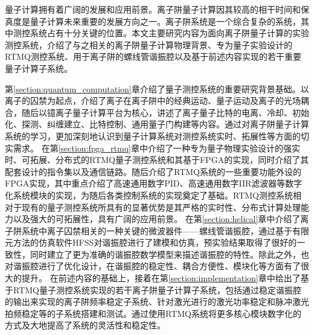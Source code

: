 
\begin{conclusion}

量子计算拥有着广阔的发展和应用前景。离子阱量子计算因其较高的相干时间和保真度是量子计算未来重要的发展方向之一。离子阱系统是一个综合复杂的系统，其中测控系统占有十分关键的位置。本文主要研究内容为面向离子阱量子计算的实验测控系统，介绍了与之相关的离子阱量子计算物理背景、专为量子实验设计的RTMQ测控系统、用于离子阱的螺线管谐振腔以及基于前述内容实现的若干重要量子计算子系统。

第\ref{section:quantum_computation}章介绍了量子测控系统的重要研究背景基础。以离子的囚禁为起点，介绍了离子在离子阱中的经典运动、量子运动及离子的光场耦合，随后以镱离子量子计算平台为核心，讲述了离子量子比特的电离、冷却、初始化、探测、纠缠建立、比特控制、通用量子门构建等内容。通过对离子阱量子计算系统的学习，更加深刻地认识到量子计算系统对测控系统实时、拓展性等方面的切实需求。
在第\ref{section:fpga_rtmq}章中介绍了一种专为量子物理实验设计的强实时、可拓展、分布式的RTMQ量子测控系统和其基于FPGA的实现，同时介绍了其配套设计的指令集以及通信链路。随后介绍了RTMQ系统的一些重要功能外设的FPGA实现，其中重点介绍了高速通用数字PID、高速通用数字IIR滤波器等数字化系统模块的实现，为随后各类控制系统的实现奠定了基础。RTMQ测控系统相对于现有的量子测控系统所具有的显著优势是其严格的实时性、分布式计算处理能力以及强大的可拓展性，具有广阔的应用前景。
在第\ref{section:helical}章中介绍了离子阱系统中离子囚禁相关的一种关键的微波器件——螺线管谐振腔，通过基于有限元方法的仿真软件HFSS对谐振腔进行了建模和仿真，预实验结果取得了很好的一致性，同时建立了更为准确的谐振腔数学模型来描述谐振腔的特性。除此之外，也对谐振腔进行了优化设计，在谐振腔的稳定性、耦合方便性、模块化等方面有了很大的提升。
在前述内容的基础上，接着在第\ref{section:implementation}章中给出了基于RTMQ量子测控系统实现的若干离子阱量子计算子系统，包括通过稳定谐振腔的输出来实现的离子阱频率稳定子系统、针对激光进行的激光功率稳定和脉冲激光拍频稳定等的子系统搭建和测试。通过使用RTMQ系统将更多核心模块数字化的方式及大地提高了系统的灵活性和稳定性。




\end{conclusion}


